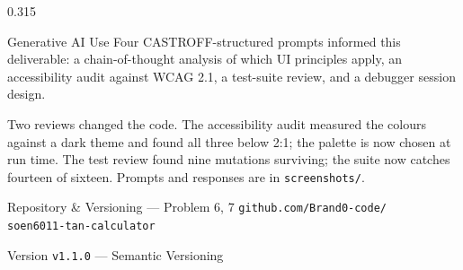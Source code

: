 \documentclass[final]{beamer}
\begin{document}
\begin{frame}[t]
\begin{columns}[t]
\begin{column}{0.315\textwidth}
\begin{block}{Generative AI Use}
  Four CASTROFF-structured prompts informed this deliverable: a
  chain-of-thought analysis of which UI principles apply, an
  accessibility audit against WCAG 2.1, a test-suite review, and a
  debugger session design.
  \vspace{0.25cm}

  Two reviews changed the code. The accessibility audit measured the
  colours against a dark theme and found all three below 2:1; the
  palette is now chosen at run time. The test review found nine
  mutations surviving; the suite now catches fourteen of sixteen.
  Prompts and responses are in \texttt{screenshots/}.
\end{block}

\begin{block}{Repository \& Versioning --- Problem 6, 7}
  \centering
  {\small\texttt{github.com/Brand0-code/}}\\
  {\small\texttt{soen6011-tan-calculator}}
  \vspace{0.15cm}

  {\small Version \texttt{v1.1.0} --- Semantic Versioning}
\end{block}

\end{column}

\end{columns}

\end{frame}
\end{document}
